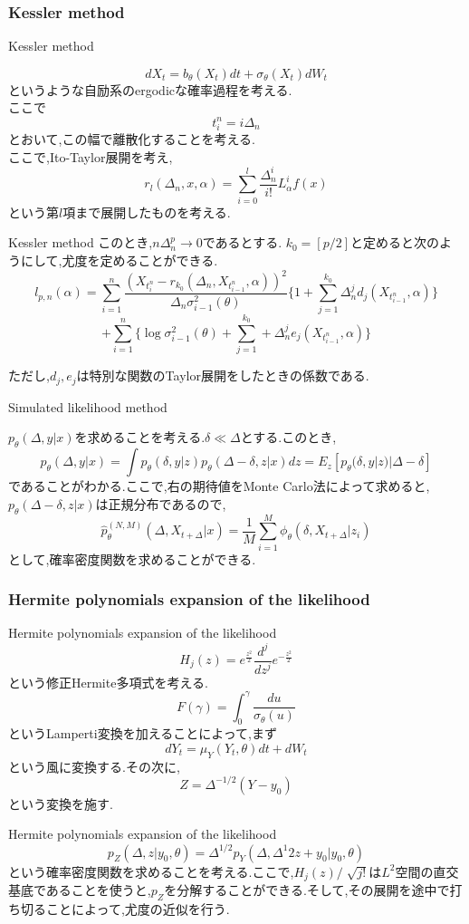 \documentclass[dvipdfmx,cjk]{beamer}
\numberwithin{equation}{section}
\begin{document}
\subsubsection{Kessler method}
\begin{frame}{Kessler method}

\[
dX_t = b_\theta (X_t) dt + \sigma_\theta(X_t) dW_t
\]
というような自励系のergodicな確率過程を考える.\\
ここで
\[
t^n_i = i \Delta_n
\]
とおいて,この幅で離散化することを考える.\\
ここで,Ito-Taylor展開を考え,
\[
r_l(\Delta_n,x,\alpha) =\sum_{i=0}^l
	\frac{\Delta_n^i}{i!}L^i_\alpha f(x)
\]
という第$l$項まで展開したものを考える.
\end{frame}
\begin{frame}{Kessler method}
このとき,$n\Delta_n^p \to 0$であるとする.
$k_0 = [p/2]$と定めると次のようにして,尤度を定めることができる.
\[
l_{p,n}(\alpha) =
\sum_{i=1}^n
	\frac{(X_{t^n_i} - r_{k_0}(\Delta_n,X_{t^n_{i-1}},\alpha))^2}{\Delta_n \sigma^2_{i-1}(\theta)}
	\biggl\{
		1+\sum_{j=1}^{k_0} \Delta_n^j d_j(X_{t^n_{i-1}},\alpha)
	\biggl\}
\]
\[	
+ \sum_{i=1}^n
	\biggl\{
		\log \sigma^2_{i-1}(\theta) + 
		\sum_{j=1}^{k_0} + \Delta_n^j e_j(X_{t^n_{i-1}},\alpha)
	\biggl\}
\]

ただし,$d_j,e_j$は特別な関数のTaylor展開をしたときの係数である.
\end{frame}
\begin{frame}{Simulated likelihood method}

$p_\theta(\Delta,y|x)$を求めることを考える.$\delta \ll \Delta$とする.このとき,
\[
p_\theta(\Delta,y|x) = 
\int p_\theta(\delta,y|z)p_\theta(\Delta - \delta,z|x)dz 
= E_z[p_\theta(\delta,y|z)|\Delta-\delta]
\]
であることがわかる.ここで,右の期待値をMonte Carlo法によって求めると,
$p_\theta(\Delta - \delta,z|x)$は正規分布であるので,
\[
\hat{p}_\theta^{(N,M)}(\Delta,X_{t+\Delta}|x)
= \frac{1}{M}\sum_{i=1}^M \phi_\theta(\delta,X_{t+\Delta}|z_i)
\]
として,確率密度関数を求めることができる.
\end{frame}
\subsubsection{Hermite polynomials expansion of the likelihood}
\begin{frame}{Hermite polynomials expansion of the likelihood}
\[
H_j(z) = e^{\frac{z^2}{2}} \frac{d^j}{dz^j} e^{-\frac{z^2}{2}} 
\]
という修正Hermite多項式を考える.
\[
F(\gamma) = \int_0^\gamma \frac{du}{\sigma_\theta(u)}
\]
というLamperti変換を加えることによって,まず
\[
dY_t = \mu_Y(Y_t,\theta)dt + dW_t
\]
という風に変換する.その次に,
\[
Z = \Delta^{-1/2} (Y-y_0)
\]
という変換を施す.
\end{frame}
\begin{frame}{Hermite polynomials expansion of the likelihood}
\[
p_Z(\Delta,z|y_0,\theta) = \Delta^{1/2} p_Y(\Delta,\Delta^{1}{2}z+y_0|y_0,\theta)
\]
という確率密度関数を求めることを考える.ここで,$H_j(z)/\sqrt[]{j!}$は$L^2$空間の直交基底であることを使うと,$p_Z$を分解することができる.そして,その展開を途中で打ち切ることによって,尤度の近似を行う.
\end{frame}
\end{document}
